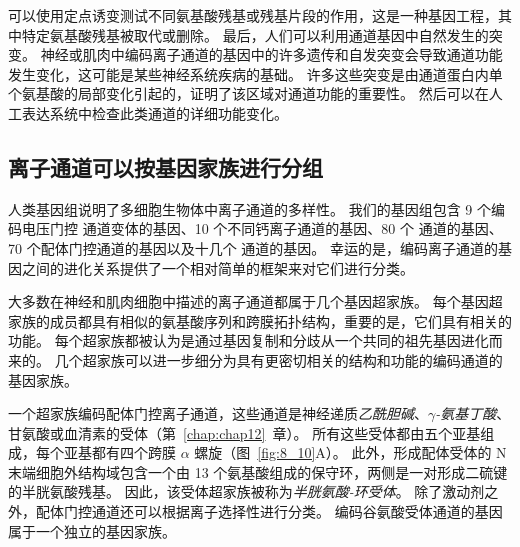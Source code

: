 可以使用定点诱变测试不同氨基酸残基或残基片段的作用，这是一种基因工程，其中特定氨基酸残基被取代或删除。
最后，人们可以利用通道基因中自然发生的突变。
神经或肌肉中编码离子通道的基因中的许多遗传和自发突变会导致通道功能发生变化，这可能是某些神经系统疾病的基础。
许多这些突变是由通道蛋白内单个氨基酸的局部变化引起的，证明了该区域对通道功能的重要性。
然后可以在人工表达系统中检查此类通道的详细功能变化。



\subsection{离子通道可以按基因家族进行分组}

人类基因组说明了多细胞生物体中离子通道的多样性。 我们的基因组包含 9 个编码电压门控  通道变体的基因、10 个不同钙离子通道的基因、80 个  通道的基因、70 个配体门控通道的基因以及十几个  通道的基因。
幸运的是，编码离子通道的基因之间的进化关系提供了一个相对简单的框架来对它们进行分类。


大多数在神经和肌肉细胞中描述的离子通道都属于几个基因超家族。
每个基因超家族的成员都具有相似的氨基酸序列和跨膜拓扑结构，重要的是，它们具有相关的功能。
每个超家族都被认为是通过基因复制和分歧从一个共同的祖先基因进化而来的。
几个超家族可以进一步细分为具有更密切相关的结构和功能的编码通道的基因家族。


一个超家族编码配体门控离子通道，这些通道是神经递质\textit{乙酰胆碱}、\textit{$\gamma$-氨基丁酸}、甘氨酸或血清素的受体（第~\ref{chap:chap12}~章）。 
所有这些受体都由五个亚基组成，每个亚基都有四个跨膜 $\alpha$ 螺旋（图~\ref{fig:8_10}A）。 
此外，形成配体受体的 N 末端细胞外结构域包含一个由 13 个氨基酸组成的保守环，两侧是一对形成二硫键的半胱氨酸残基。
因此，该受体超家族被称为\textit{半胱氨酸-环受体}。
除了激动剂之外，配体门控通道还可以根据离子选择性进行分类。
编码谷氨酸受体通道的基因属于一个独立的基因家族。


